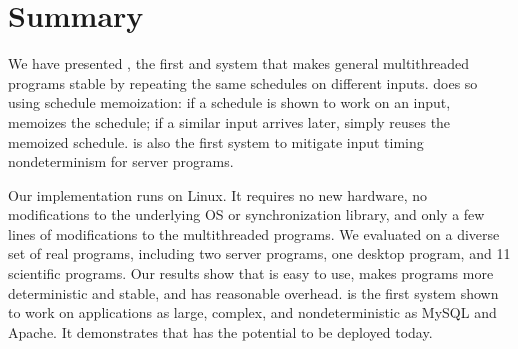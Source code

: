 \section{Summary}
\label{sec:tern-summary}

We have presented \tern, the first \smt and \dmt system that makes general
multithreaded programs stable by repeating the same schedules on different
inputs.  \tern does so using schedule memoization: if a schedule is shown
to work on an input, \tern memoizes the schedule; if a similar input
arrives later, \tern simply reuses the memoized schedule. \tern is also the
first \dmt system to mitigate input timing nondeterminism for server
programs.

Our \tern implementation runs on Linux.  It requires no new hardware, no
modifications to the underlying OS or synchronization library, and only a
few lines of modifications to the multithreaded programs.  We evaluated
\tern on a diverse set of real programs, including two server programs, one
desktop program, and 11 scientific programs.  Our results show that
\tern is easy to use, makes programs more deterministic and stable, and has
reasonable overhead.  \tern is the first \dmt system shown to work on
applications as large, complex, and nondeterministic as MySQL and Apache.
It demonstrates that \dmt has the potential to be deployed today.

